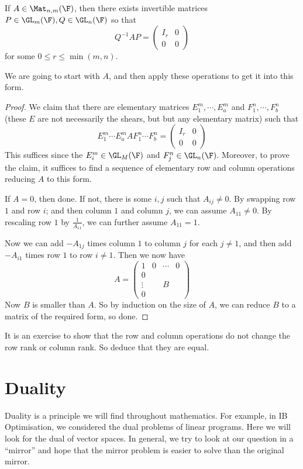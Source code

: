 \documentclass[a4paper]{article}
\begin{document}
\begin{prop}
  If $A\in \Mat_{n, m}(\F)$, then there exists invertible matrices $P \in \GL_m(\F), Q\in \GL_n(\F)$ so that
  \[
    Q^{-1}AP =
    \begin{pmatrix}
      I_r & 0\\
      0 & 0
    \end{pmatrix}
  \]
  for some $0 \leq r \leq \min(m, n)$.
\end{prop}

We are going to start with $A$, and then apply these operations to get it into this form.

\begin{proof}
  We claim that there are elementary matrices $E_1^m, \cdots, E_a^m$ and $F_1^n, \cdots, F_b^n$ (these $E$ are not necessarily the shears, but but any elementary matrix) such that
  \[
    E_1^m \cdots E_a^m AF_1^n \cdots F_b^n =
    \begin{pmatrix}
      I_r & 0\\
      0 & 0
    \end{pmatrix}
  \]
  This suffices since the $E_i^m \in \GL_M(\F)$ and $F_j^n \in \GL_n(\F)$. Moreover, to prove the claim, it suffices to find a sequence of elementary row and column operations reducing $A$ to this form.

  If $A = 0$, then done. If not, there is some $i, j$ such that $A_{ij} \not= 0$. By swapping row $1$ and row $i$; and then column $1$ and column $j$, we can assume $A_{11} \not= 0$. By rescaling row $1$ by $\frac{1}{A_{11}}$, we can further assume $A_{11} = 1$.

  Now we can add $-A_{1j}$ times column $1$ to column $j$ for each $j \not= 1$, and then add $-A_{i1}$ times row $1$ to row $i \not= 1$.  Then we now have
  \[
    A =
    \begin{pmatrix}
      1 & 0 & \cdots & 0\\
      0 \\
      \vdots & & B\\
      0 &
    \end{pmatrix}
  \]
  Now $B$ is smaller than $A$. So by induction on the size of $A$, we can reduce $B$ to a matrix of the required form, so done.
\end{proof}
It is an exercise to show that the row and column operations do not change the row rank or column rank. So deduce that they are equal.

\section{Duality}
Duality is a principle we will find throughout mathematics. For example, in IB Optimisation, we considered the dual problems of linear programs. Here we will look for the dual of vector spaces. In general, we try to look at our question in a ``mirror'' and hope that the mirror problem is easier to solve than the original mirror.
\end{document}
